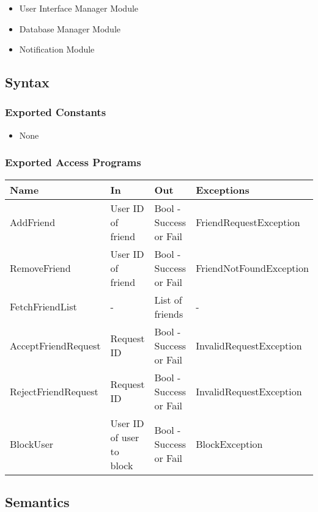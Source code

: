 \documentclass[12pt, titlepage]{article}
\begin{document}
\begin{itemize}
    \item User Interface Manager Module
    \item Database Manager Module
    \item Notification Module
\end{itemize}

\subsection{Syntax}

\subsubsection{Exported Constants}

\begin{itemize}
    \item None
\end{itemize}

\subsubsection{Exported Access Programs}

\begin{center}
\begin{tabular}{p{4cm} p{4cm} p{4cm} p{4cm}}
\hline
\textbf{Name} & \textbf{In} & \textbf{Out} & \textbf{Exceptions} \\
\hline
AddFriend & User ID of friend & Bool - Success or Fail & FriendRequestException \\
\hline
RemoveFriend & User ID of friend & Bool - Success or Fail & FriendNotFoundException \\
\hline
FetchFriendList & - & List of friends & - \\
\hline
AcceptFriendRequest & Request ID & Bool - Success or Fail & InvalidRequestException \\
\hline
RejectFriendRequest & Request ID & Bool - Success or Fail & InvalidRequestException \\
\hline
BlockUser & User ID of user to block & Bool - Success or Fail & BlockException \\
\hline
\end{tabular}
\end{center}


\subsection{Semantics}
\end{document}
